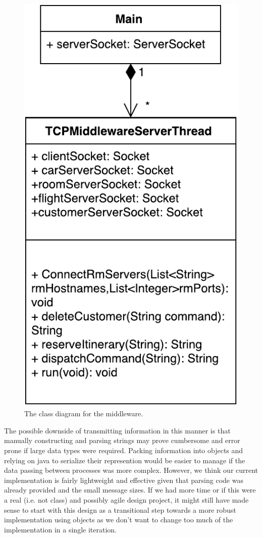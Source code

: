 \documentclass{article}
\begin{document}
\begin{figure}[h]
\centering
\includegraphics[scale=0.6]{figures/middleware-class.pdf}
\caption{The class diagram for the middleware.}
\label{f:server-class}
\end{figure}

The possible downside of transmitting information in this manner is that manually constructing and parsing strings may prove cumbersome and error prone if large data types were required. 
Packing information into objects and relying on java to serialize their represention would be easier to manage if the data passing between processes was more complex. 
However, we think our current implementation is fairly lightweight and effective given that parsing code was already provided and the small message sizes. 
If we had more time or if this were a real (i.e. not class) and possibly agile design project, it might still have made sense to start with this design as a transitional step towards a more robust implementation using objects as we don't want to change too much of the implementation in a single iteration. 
 
\end{document}
